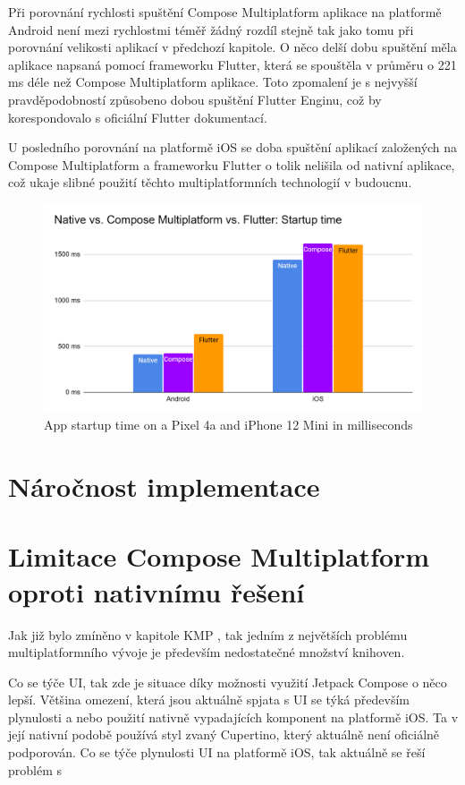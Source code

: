 
Při porovnání rychlosti spuštění Compose Multiplatform aplikace na platformě Android není mezi rychlostmi téměř žádný
rozdíl stejně tak jako tomu při porovnání velikosti aplikací v předchozí kapitole. O něco delší dobu spuštění měla
aplikace napsaná pomocí frameworku Flutter, která se spouštěla v průměru o 221 ms déle než Compose Multiplatform aplikace. 
Toto zpomalení je s nejvyšší pravděpodobností způsobeno dobou spuštění Flutter Enginu, což by korespondovalo s oficiální
Flutter dokumentací. \cite{flutterPerformance}

U posledního porovnání na platformě iOS se doba spuštění aplikací založených na Compose Multiplatform a frameworku 
Flutter o tolik nelišila od nativní aplikace, což ukaje slibné použití těchto multiplatformních technologií v budoucnu.

\begin{figure}[H]
  \centering
  \includegraphics[width=.7\textwidth]{chart_startup_times.png}
  \caption{App startup time on a Pixel 4a and iPhone 12 Mini in milliseconds}
  \label{fig:chart_startup_times}
\end{figure}

\section{Náročnost implementace}
\section{Limitace Compose Multiplatform oproti nativnímu řešení} 
Jak již bylo zmíněno v kapitole KMP , tak jedním z největších problému multiplatformního vývoje je především nedostatečné množství knihoven. 

Co se týče UI, tak zde je situace díky možnosti využití Jetpack Compose o něco lepší. Většina omezení, která jsou
aktuálně spjata s UI se týká především plynulosti a nebo použití nativně vypadajících komponent na platformě iOS.
Ta v její nativní podobě používá styl zvaný Cupertino, který aktuálně není oficiálně podporován. Co se týče plynulosti UI
na platformě iOS, tak aktuálně se řeší problém s

